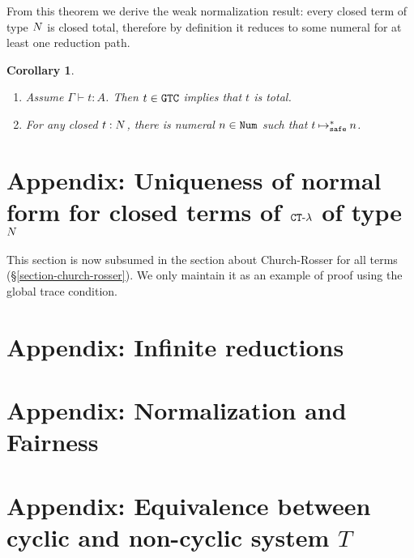 \documentclass{article}
\newtheorem{corollary}[theorem]{Corollary}
\begin{document}
From this theorem we derive the weak normalization result: 
every closed term of type ${N}$ is closed total, therefore by definition it reduces to some numeral for at least
one reduction path. 

\begin{corollary}\label{cor:WN_typeN}
  \begin {enumerate}
  \item
   Assume  $\Gamma\vdash t:A$. Then $t \in {\tt GTC}$ implies that $t$ is total.
  \item
    For any closed $t:{N}$, there is numeral $n\in{\tt Num}$ such that $t\mathbin{\mathbin{\mapsto}_{\hbox{\scriptsize \tt safe}}^*} n$. 
  \end{enumerate}
\end{corollary}



\section{Appendix: Uniqueness of normal form for closed terms of ${ {\tt CT} \mbox{-} \lambda}$ of type ${N}$}
\label{section-uniqueness-normal-form}
This section is now subsumed in the section about Church-Rosser for all terms (\S \ref{section-church-rosser}). 
We only maintain it as an example of proof using the global trace condition.
\\




\section{Appendix: Infinite reductions}
\label{section-infinite-reductions}




\section{Appendix: Normalization and Fairness}
\label{section-normalization-fairness}



\section{Appendix: Equivalence between cyclic and non-cyclic system $T$} 
\label{section-equivalence-cyclic-non-cyclic-T}

\end{document}
